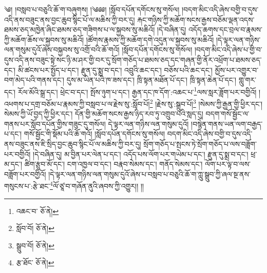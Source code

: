 \setcounter{footnote}{0} 
༄། །བསླབ་པ་བཅུའི་ཆོ་ག་བཞུགས། །༄༅༅། །སློབ་དཔོན་དགོངས་སུ་གསོལ། །བདག་མིང་འདི་ཞེས་བགྱི་བ་དུས་འདི་ནས་བཟུང་ནས་བྱང་ཆུབ་སྙིང་པོ་ལ་མཆིས་ཀྱི་བར་དུ། རྐང་གཉིས་ཀྱི་མཆོག་སངས་རྒྱས་བཅོམ་ལྡན་འདས་ཐམས་ཅད་མཁྱེན་ཞིང་ཐམས་ཅད་གཟིགས་པ་ལ་སྐྱབས་སུ་མཆིའོ། །དེ་བཞིན་དུ། འདོད་ཆགས་དང་བྲལ་བ་རྣམས་ཀྱི་མཆོག་ཆོས་ལ་སྐྱབས་སུ་མཆིའོ། །ཚོགས་རྣམས་ཀྱི་མཆོག་དགེ་འདུན་ལ་སྐྱབས་སུ་མཆིའོ། །དེ་ལྟར་ལན་གཉིས་ལན་གསུམ་དུའོ་ཞེས་བསྐྱབས་སུ་འགྲོ་བའི་ཆོ་གའོ། །སློབ་དཔོན་དགོངས་སུ་གསོལ། །བདག་མིང་འདི་ཞེས་པ་གྱི་བ་དུས་འདི་ནས་བཟུང་སྟེ་སང་ཉི་མ་ཤར་གྱི་བར་དུ་སྲོག་གཅོད་པ་ཐམས་ཅད་དང་གཞན་གྱི་ནོར་འཕྲོག་པ་ཐམས་ཅད་དང་། མི་ཚངས་པར་སྤྱོད་པ་དང་། རྫུན་དུ་སྨྲ་བ་དང་། འབྲུའི་ཆང་དང་། བཅོས་པའི་ཆང་དང་། མྱོས་པར་འགྱུར་བ་བག་མེད་པའི་གནས་དང་། དུས་མ་ཡིན་པའི་ཁ་ཟས་དང་། ཁྲི་སྟན་མཐོན་པོ་དང་། ཁྲི་སྟན་ཆེན་པོ་དང་། གླུ་གར་དང་། རོལ་མོའི་སྒྲ་དང་། ཕྲེང་བ་དང་། སྤོས་ཉུག་པ་དང་། རྒྱན་དང་ཁ་དོག་:འཆང་པ་\footnote{འཆང་བ་  ཅོ་ནེ། }ལས་སླར་ཟློག་པར་བགྱིའོ། །འཕགས་པ་དགྲ་བཅོམ་པ་རྣམས་ཀྱི་བསླབ་པ་ལ་རྗེས་སུ་:སློབ་པོ།\footnote{སློབ་བོ།  ཅོ་ནེ། } །རྗེས་སུ་:སྒྲུབ་པོ།\footnote{སྒྲུབ་བོ།  ཅོ་ནེ། } །སེམས་ཀྱི་རྒྱན་གྱི་ཕྱིར་དང་། སེམས་ཀྱི་ཡོ་བྱད་ཀྱི་ཕྱིར་དང་། དོན་གྱི་མཆོག་སངས་རྒྱས་ཉིད་རབ་ཏུ་འགྲུབ་པའི་སླད་དུ། བདག་གསོ་སྦྱོང་ལ་གནས་པར་སློབ་དཔོན་གྱིས་གཟུང་དུ་གསོལ། དེ་ལྟར་ལན་གཉིས་ལན་གསུམ་དུའོ། །བསྙེན་གནས་ཡན་ལག་བརྒྱད་པ་དང་། གསོ་སྦྱོང་གི་སྡོམ་པའི་ཆོ་གའོ། །སློབ་དཔོན་དགོངས་སུ་གསོལ། བདག་མིང་འདི་ཞེས་བགྱི་བ་དུས་འདི་ནས་བཟུང་ནས་ཇི་སྲིད་བྱང་ཆུབ་སྙིང་པོ་ལ་མཆིས་ཀྱི་བར་དུ། སྲོག་གཅོད་པ་སྤངས་ཏེ་སྲོག་གཅོད་པ་ལས་བཟློག་པར་བགྱིའོ། །དེ་བཞིན་དུ། མ་བྱིན་པར་ལེན་པ་དང་། འདོད་པས་ལོག་པར་གཡེམ་པ་དང་། རྫུན་དུ་སྨྲ་བ་དང་། ཕྲ་མ་དང་། ཚིག་རྩུབ་མོ་དང་། ངག་འཁྱལ་བ་དང་། བརྣབ་སེམས་དང་། གནོད་སེམས་དང་། ལོག་པར་ལྟ་བ་ལས་བཟློག་པར་བགྱིའོ། །དེ་ལྟར་ལན་གཉིས་ལན་གསུམ་དུའོ་ཞེས་པ་བསླབ་པ་བཅུའི་ཆོ་ག་ཀླུ་སྒྲུབ་ཀྱི་ཞལ་སྔ་ནས་གསུངས་པ་:རྩེ་ཐང་\footnote{རྩ་ཐོང་  ཅོ་ནེ། }ལོ་ཙཱ་བ་གཞོན་ནུའི་ཞབས་ཀྱི་འགྱུར།། །།